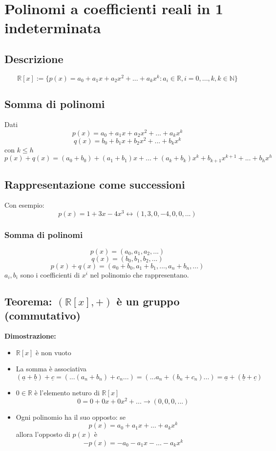 \section{Polinomi a coefficienti reali in 1 indeterminata}

\subsection{Descrizione}
\[\mathbb{R}[x]:=\{p(x)=a_0+a_1x+a_2x^2+...+a_kx^k: a_i\in\mathbb{R}, i=0,...,k, k\in\mathbb{N}\}\]

\subsection{Somma di polinomi}
Dati
\[p(x)=a_0+a_1x+a_2x^2+...+a_kx^k\]
\[q(x)=b_0+b_1x+b_2x^2+...+b_kx^k\]
con \(k\leq h\)
\[p(x)+q(x)=(a_0+b_0)+(a_1+b_1)x+...+(a_k+b_k)x^k+b_{k+1}x^{k+1}+...+b_hx^h\]

\subsection{Rappresentazione come successioni}
Con esempio:
\[p(x)=1+3x-4x^3 \leftrightarrow (1,3,0,-4,0,0,...)\]

\subsubsection{Somma di polinomi}
\[p(x)=(a_0,a_1,a_2,...)\]
\[q(x)=(b_0,b_1,b_2,...)\]
\[p(x)+q(x)=(a_0+b_0,a_1+b_1,...,a_n+b_n,...)\]
\(a_i,b_i\) sono i coefficienti di \(x^i\) nel polinomio che rappresentano.

\subsection{Teorema: \((\mathbb{R}[x],+)\) è un gruppo (commutativo)}
\textbf{Dimostrazione:}
\begin{itemize}
	\item \(\mathbb{R}[x]\) è non vuoto

	\item La somma è associativa
	\[(\underline{a}+\underline{b})+\underline{c} = (...(a_n+b_n)+c_n...)=(...a_n+(b_n+c_n)...)=\underline{a}+(\underline{b}+\underline{c})\]

	\item \(0\in\mathbb{R}\) è l'elemento neturo di \(\mathbb{R}[x]\)
	\[0=0+0x+0x^2+...\rightarrow(0,0,0,...)\]

	\item Ogni polinomio ha il suo opposto: se \[p(x)=a_0+a_1x+...+a_kx^k\] allora l'opposto di \(p(x)\) è \[-p(x)=-a_0-a_1x-...-a_kx^k\]

\end{itemize}

